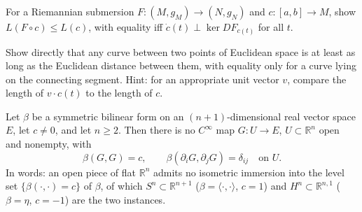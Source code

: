 \begin{remark}
  \label{rem:pet-ch1-ex-18}
  \leanok
  For a Riemannian submersion $F:(M,g_M)\to(N,g_N)$ and $c:[a,b]\to M$, show
  $L(F\circ c)\le L(c)$, with equality iff $\dot c(t)\perp\ker DF_{c(t)}$ for all
  $t$.
\end{remark}

\begin{remark}
  \label{rem:pet-ch1-ex-19}
  \leanok
  Show directly that any curve between two points of Euclidean space is at least
  as long as the Euclidean distance between them, with equality only for a
  curve lying on the connecting segment. Hint: for an appropriate unit vector
  $v$, compare the length of $v\cdot c(t)$ to the length of $c$.
\end{remark}

\begin{proposition}
  \label{prop:pet-ch1-no-flat-immersion}
  \leanok
  Let $\beta$ be a symmetric bilinear form on an $(n+1)$-dimensional real
  vector space $E$, let $c\ne0$, and let $n\ge2$. Then there is no
  $C^\infty$ map $G:U\to E$, $U\subset\mathbb{R}^n$ open and nonempty, with
  \[
    \beta(G,G)=c,\qquad \beta(\partial_iG,\partial_jG)=\delta_{ij}
    \quad\text{on }U .
  \]
  In words: an open piece of flat $\mathbb{R}^n$ admits no isometric
  immersion into the level set $\{\beta(\cdot,\cdot)=c\}$ of $\beta$, of which
  $S^n\subset\mathbb{R}^{n+1}$ ($\beta=\langle\cdot,\cdot\rangle$, $c=1$) and
  $H^n\subset\mathbb{R}^{n,1}$ ($\beta=\eta$, $c=-1$) are the two instances.
\end{proposition}

